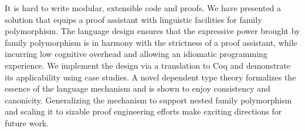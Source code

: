 It is hard to write modular, extensible code and proofs.
We have presented a solution that equips a proof assistant with
linguistic facilities for family polymorphism.
The language design ensures that the expressive power brought by family polymorphism
is in harmony with the strictness of a proof assistant, while incurring
low cognitive overhead and allowing an idiomatic programming experience.
We implement the design via a translation to Coq and demonstrate its applicability
using case studies.
A novel dependent type theory formalizes the essence of the language mechanism
and is shown to enjoy consistency and canonicity.
Generalizing the mechanism to support nested family polymorphism and
scaling it to sizable proof engineering efforts make exciting directions for
future work.